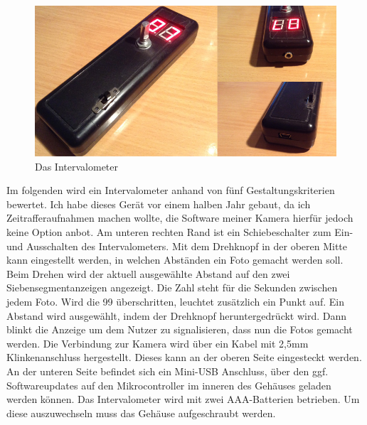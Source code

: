 \documentclass[a4paper,10pt]{article}
\begin{document}
\kopf
\renewcommand{\figurename}{Abbildung}


\begin{figure}[ht]
\centering \includegraphics[width=1.0\textwidth]{intervalometer.jpg}
\caption{Das Intervalometer}
\end{figure}

Im folgenden wird ein Intervalometer anhand von fünf Gestaltungskriterien bewertet. Ich habe dieses Gerät vor einem halben Jahr gebaut, da ich Zeitrafferaufnahmen machen wollte, die Software meiner Kamera hierfür jedoch keine Option anbot. Am unteren rechten Rand ist ein Schiebeschalter zum Ein- und Ausschalten des Intervalometers. Mit dem Drehknopf in der oberen Mitte kann eingestellt werden, in welchen Abständen ein Foto gemacht werden soll. Beim Drehen wird der aktuell ausgewählte Abstand auf den zwei Siebensegmentanzeigen angezeigt. Die Zahl steht für die Sekunden zwischen jedem Foto. Wird die 99 überschritten, leuchtet zusätzlich ein Punkt auf. Ein Abstand wird ausgewählt, indem der Drehknopf heruntergedrückt wird. Dann blinkt die Anzeige um dem Nutzer zu signalisieren, dass nun die Fotos gemacht werden. Die Verbindung zur Kamera wird über ein Kabel mit 2,5mm Klinkenanschluss hergestellt. Dieses kann an der oberen Seite eingesteckt werden. An der unteren Seite befindet sich ein Mini-USB Anschluss, über den ggf. Softwareupdates auf den Mikrocontroller im inneren des Gehäuses geladen werden können. Das Intervalometer wird mit zwei AAA-Batterien betrieben. Um diese auszuwechseln muss das Gehäuse aufgeschraubt werden.
\end{document}
